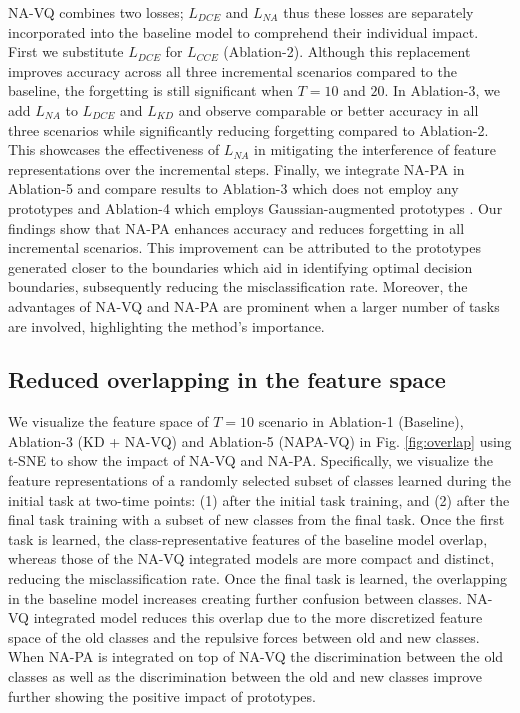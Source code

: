 \documentclass[10pt,twocolumn,letterpaper]{article}
\begin{document}
  NA-VQ combines two losses; $L_{DCE}$ and $L_{NA}$ thus these losses are separately incorporated into the baseline model to comprehend their individual impact. First we substitute $L_{DCE}$ for $L_{CCE}$ (Ablation-2). Although this replacement improves accuracy across all three incremental scenarios compared to the baseline, the forgetting is still significant when $T=10$ and $20$. In Ablation-3, we add $L_{NA}$ to $L_{DCE}$ and $L_{KD}$ and observe comparable or better accuracy in all three scenarios while significantly reducing forgetting compared to  Ablation-2. This showcases the effectiveness of $L_{NA}$ in mitigating the interference of feature representations over the incremental steps. Finally, we integrate NA-PA in Ablation-5 and compare results to Ablation-3 which does not employ any prototypes and Ablation-4 which employs Gaussian-augmented prototypes  \cite{Zhu2021PrototypeLearning}. Our findings show that NA-PA enhances accuracy and reduces forgetting in all incremental scenarios. This improvement can be attributed to the prototypes generated closer to the boundaries which aid in identifying optimal decision boundaries, subsequently reducing the misclassification rate. Moreover, the advantages of NA-VQ and NA-PA are prominent when a larger number of tasks are involved, highlighting the method's importance.
\subsection{Reduced overlapping in the feature space}

We visualize the feature space of $T=10$ scenario in Ablation-1 (Baseline), Ablation-3 (KD + NA-VQ) and Ablation-5  (NAPA-VQ) in Fig. \ref{fig:overlap} using t-SNE \cite{derMaaten2008VisualizingT-SNE.} to show the impact of NA-VQ and NA-PA. Specifically, we visualize the feature representations of a randomly selected subset of classes learned during the initial task at two-time points: (1) after the initial task training, and (2) after the final task training with a subset of new classes from the final task. Once the first task is learned, the class-representative features of the baseline model overlap, whereas those of the NA-VQ integrated models are more compact and distinct, reducing the misclassification rate. Once the final task is learned, the overlapping in the baseline model increases creating further confusion between classes. NA-VQ integrated model reduces this overlap due to the more discretized feature space of the old classes and the repulsive forces between old and new classes. When NA-PA is integrated on top of NA-VQ the discrimination between the old classes as well as the discrimination between the old and new classes improve further showing the positive impact of prototypes.
\end{document}

